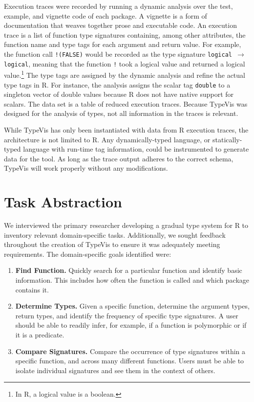 \documentclass{vgtc}                          %
\newcommand{\typevis}{{\sc TypeVis}\xspace}
\begin{document}
Execution traces were recorded by running a dynamic analysis
over the test, example, and vignette code of each package.
A vignette is a form of documentation that weaves
together prose and executable code.
An execution trace is a list of function type signatures
containing, among other attributes, the function name
and type tags for each argument and return value.
For example, the function call {\tt !(FALSE)}
would be recorded as the type signature {\tt logical $\to$ logical},
meaning that the function {\tt !} took a logical value
and returned a logical value.\footnote{
  In R, a logical value is a boolean.
}
The type tags are assigned by the dynamic analysis
and refine the actual type tags in R.
For instance, the analysis
assigns the scalar tag {\tt double} to a singleton vector of double values
because R does not have native support for scalars.
The data set is a table of reduced execution traces.
Because \typevis was designed for the analysis of types,
not all information in the traces is relevant.

While \typevis has only been instantiated with
data from R execution traces, the architecture is not limited to R.
Any dynamically-typed language, %
or statically-typed language with run-time tag information,
could be instrumented to generate data for the tool.
As long as the trace output adheres to
the correct schema, \typevis will work properly without any modifications.


\section{Task Abstraction}

We interviewed the primary researcher developing a gradual type system for R
to inventory relevant domain-specific tasks.
Additionally, we sought feedback throughout the creation of \typevis
to ensure it was adequately meeting requirements.
The domain-specific goals identified were:

\begin{enumerate}
\item {\bf Find Function.} Quickly search for a particular function and identify basic information. This includes how often the function is called and which package contains it.
\item {\bf Determine Types.} Given a specific function, determine the argument types, return types, and identify the frequency of specific type signatures. A user should be able to readily infer, for example, if a function is polymorphic or if it is a predicate.
\item {\bf Compare Signatures.} Compare the occurrence of type signatures within a specific function, and across many different functions. Users must be able to isolate individual signatures and see them in the context of others.
\end{enumerate}
\end{document}
